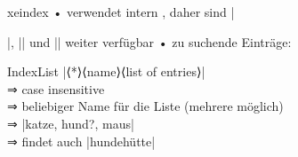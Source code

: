 \begin{frame}[fragile]{xeindex}
• verwendet intern , daher sind |\makeindex|, |\printindex| und |\index| weiter verfügbar
• zu suchende Einträge:
\•
\begin{block}{IndexList}
|\IndexList⟨*⟩{⟨name⟩}{⟨list of entries⟩}|\\
\pkg{*} ⇒ case insensitive\\
 ⇒ beliebiger Name für die Liste (mehrere möglich)\\
 ⇒ |katze, hund?, maus|\\
 ⇒ findet auch |hundehütte|
\end{block}
\end{frame}
